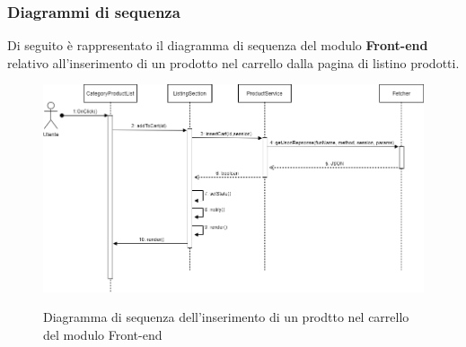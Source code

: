 \subsubsection{Diagrammi di sequenza}
Di seguito è rappresentato il diagramma di sequenza del modulo \textbf{Front-end} relativo all'inserimento di un prodotto nel carrello dalla pagina di listino prodotti.

\vspace{1cm}

\begin{figure}[H]
\centering
\includegraphics[scale=0.5]{res/Architettura/Frontend/img/sequence_frontend_insertCart}\\
\caption{Diagramma di sequenza dell'inserimento di un prodtto nel carrello del modulo Front-end}
\end{figure}